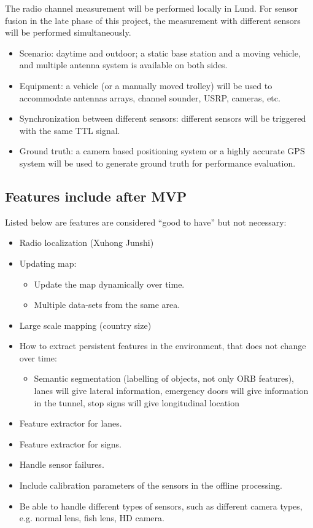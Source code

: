 The radio channel measurement will be performed locally in Lund. For sensor fusion in the late phase of this project, the measurement with different sensors will be performed simultaneously. 
\begin{itemize}
\item Scenario: daytime and outdoor; a static base station and a moving vehicle, and multiple antenna system is available on both sides. 
\item Equipment: a vehicle (or a manually moved trolley) will be used to accommodate antennas arrays, channel sounder, USRP, cameras, etc.
\item Synchronization between different sensors: different sensors will be triggered with the same TTL signal.
\item Ground truth: a camera based positioning system or a highly accurate GPS system will be used to generate ground truth for performance evaluation.     
\end{itemize}


\subsection{Features include after MVP}\label{sec:features}

Listed below are features are considered ``good to have'' but not
necessary:

\begin{itemize}
\item Radio localization  (Xuhong  Junshi)
\item Updating map:
  \begin{itemize}
  \item Update the map dynamically over time.
  \item Multiple data-sets from the same area.
  \end{itemize}
\item Large scale mapping (country size)
\item How to extract persistent features in the environment, that does
  not change over time:
  \begin{itemize}
  \item  Semantic segmentation (labelling of objects, not only ORB
    features), lanes will give lateral information, emergency doors
    will give information in the tunnel, stop signs will give
    longitudinal location
  \end{itemize}
\item Feature extractor for lanes.
\item Feature extractor for signs.
\item Handle sensor failures.
\item Include calibration parameters of the sensors in the offline processing.
\item Be able to handle different types of sensors, such as different camera types, e.g. normal lens, fish lens, HD camera.
\end{itemize}

